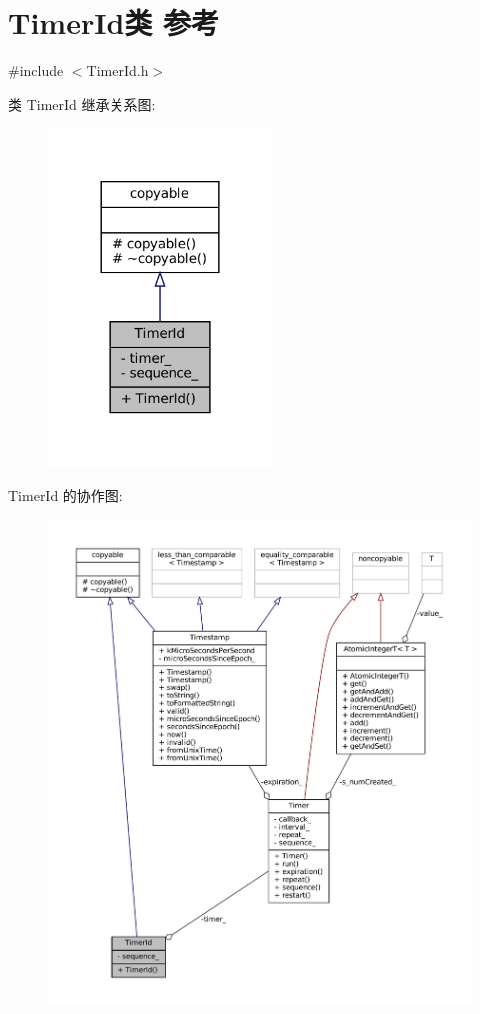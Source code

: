 \hypertarget{classmuduo_1_1TimerId}{}\section{Timer\+Id类 参考}
\label{classmuduo_1_1TimerId}


{\ttfamily \#include $<$Timer\+Id.\+h$>$}



类 Timer\+Id 继承关系图\+:
\nopagebreak
\begin{figure}[H]
\begin{center}
\leavevmode
\includegraphics[width=168pt]{classmuduo_1_1TimerId__inherit__graph}
\end{center}
\end{figure}


Timer\+Id 的协作图\+:
\nopagebreak
\begin{figure}[H]
\begin{center}
\leavevmode
\includegraphics[width=350pt]{classmuduo_1_1TimerId__coll__graph}
\end{center}
\end{figure}
